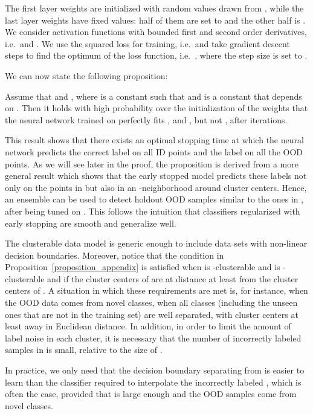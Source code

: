 The first layer weights  are initialized with random values drawn from
, while the last layer weights  have fixed values: half of them
are set to  and the other half is . We consider activation functions
 with bounded first and second order derivatives, i.e.\  and .
We use the squared loss for training, i.e.\  and take gradient descent steps to find the optimum of the loss
function, i.e.\ , where the step
size is set to .

We can now state the following proposition:

\begin{proposition}
  \label{proposition_appendix}

  Assume that  and , where  is a constant such that  and  is a constant that depends on .
  Then it holds with high probability  over the
  initialization of the weights that the neural network trained on  perfectly fits , 
  and , but not , after
   iterations.


\end{proposition}

This result shows that there exists an optimal stopping time at which the neural
network predicts the correct label on all ID points and the label 
on all the OOD points. As we will see later in the proof, the proposition is
derived from a more general result which shows that the early stopped model
predicts these labels not only on the points in  but also in an
-neighborhood around cluster centers. Hence, an  ensemble can be
used to detect holdout OOD samples similar to the ones in , after
being tuned on . This follows the intuition that classifiers
regularized with early stopping are smooth and generalize well.

The clusterable data model is generic enough to include data sets with
non-linear decision boundaries. Moreover, notice that the condition in
Proposition~\ref{proposition_appendix} is satisfied when  is -clusterable and  is
-clusterable and if the cluster centers of  are at
distance at least  from the cluster centers of . A situation in which these requirements are met is, for
instance, when the OOD data comes from novel classes, when all classes
(including the unseen ones that are not in the training set) are well separated,
with cluster centers at least  away in Euclidean distance. In addition,
in order to limit the amount of label noise in each cluster, it is necessary
that the number of incorrectly labeled samples in  is
small, relative to the size of .

In practice, we only need that the decision boundary separating
 from  is easier to learn than the classifier
required to interpolate the incorrectly labeled , which
is often the case, provided that  is large enough and the OOD
samples come from novel classes.

